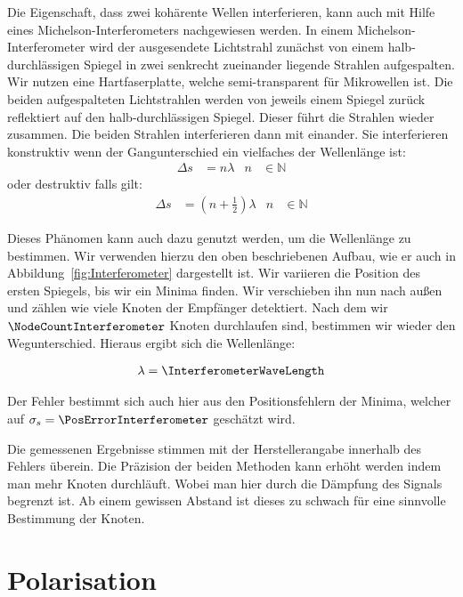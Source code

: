 \documentclass[a4paper,10pt,twocolumn]{article}
\begin{document}
    Die Eigenschaft, dass zwei kohärente Wellen interferieren, kann auch mit Hilfe eines Michelson-Interferometers
    nachgewiesen werden.
    In einem Michelson-Interferometer wird der ausgesendete Lichtstrahl zunächst von einem halb-durchlässigen
    Spiegel in zwei senkrecht zueinander liegende Strahlen aufgespalten.
    Wir nutzen eine Hartfaserplatte, welche semi-transparent für Mikrowellen ist.
    Die beiden aufgespalteten Lichtstrahlen werden von jeweils einem Spiegel zurück reflektiert auf den
    halb-durchlässigen Spiegel.
    Dieser führt die Strahlen wieder zusammen.
    Die beiden Strahlen interferieren dann mit einander.
    Sie interferieren konstruktiv wenn der Gangunterschied ein vielfaches der Wellenlänge ist:
    \begin{align*}
        \Delta s &= n \lambda & n &\in \mathds{N}
    \end{align*}
    oder destruktiv falls gilt:
    \begin{align*}
        \Delta s &= (n + \frac{1}{2}) \lambda & n &\in \mathds{N}
    \end{align*}
    
    Dieses Phänomen kann auch dazu genutzt werden, um die Wellenlänge zu bestimmen.
    Wir verwenden hierzu den oben beschriebenen Aufbau, wie er auch in Abbildung~\ref{fig:Interferometer}
    dargestellt ist.
    Wir variieren die Position des ersten Spiegels, bis wir ein Minima finden.
    Wir verschieben ihn nun nach außen und zählen wie viele Knoten der Empfänger detektiert.
    Nach dem wir $\NodeCountInterferometer$ Knoten durchlaufen sind, bestimmen wir wieder den
    Wegunterschied.
    Hieraus ergibt sich die Wellenlänge:
    
    \begin{align*}
        \lambda = \InterferometerWaveLength
    \end{align*}
    
    Der Fehler bestimmt sich auch hier aus den Positionsfehlern der Minima, welcher
    auf $\sigma_s = \PosErrorInterferometer$ geschätzt wird.
    
    Die gemessenen Ergebnisse stimmen mit der Herstellerangabe innerhalb des Fehlers überein.
    Die Präzision der beiden Methoden kann erhöht werden indem man mehr Knoten durchläuft.
    Wobei man hier durch die Dämpfung des Signals begrenzt ist.
    Ab einem gewissen Abstand ist dieses zu schwach für eine sinnvolle Bestimmung der Knoten.
    
    \section{Polarisation}
\end{document}
